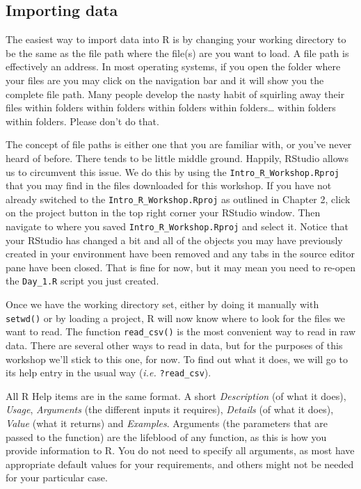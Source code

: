 \documentclass[
]{book}
\begin{document}
\hypertarget{importing-data}{%
\subsection{Importing data}\label{importing-data}}

The easiest way to import data into R is by changing your working directory to be the same as the file path where the file(s) are you want to load. A file path is effectively an address. In most operating systems, if you open the folder where your files are you may click on the navigation bar and it will show you the complete file path. Many people develop the nasty habit of squirling away their files within folders within folders within folders within folders\ldots{} within folders within folders. Please don't do that.

The concept of file paths is either one that you are familiar with, or you've never heard of before. There tends to be little middle ground. Happily, RStudio allows us to circumvent this issue. We do this by using the \texttt{Intro\_R\_Workshop.Rproj} that you may find in the files downloaded for this workshop. If you have not already switched to the \texttt{Intro\_R\_Workshop.Rproj} as outlined in Chapter 2, click on the project button in the top right corner your RStudio window. Then navigate to where you saved \texttt{Intro\_R\_Workshop.Rproj} and select it. Notice that your RStudio has changed a bit and all of the objects you may have previously created in your environment have been removed and any tabs in the source editor pane have been closed. That is fine for now, but it may mean you need to re-open the \texttt{Day\_1.R} script you just created.

Once we have the working directory set, either by doing it manually with \texttt{setwd()} or by loading a project, R will now know where to look for the files we want to read. The function \texttt{read\_csv()} is the most convenient way to read in raw data. There are several other ways to read in data, but for the purposes of this workshop we'll stick to this one, for now. To find out what it does, we will go to its help entry in the usual way (\emph{i.e.} \texttt{?read\_csv}).

All R Help items are in the same format. A short \emph{Description} (of what it does), \emph{Usage}, \emph{Arguments} (the different inputs it requires), \emph{Details} (of what it does), \emph{Value} (what it returns) and \emph{Examples}. Arguments (the parameters that are passed to the function) are the lifeblood of any function, as this is how you provide information to R. You do not need to specify all arguments, as most have appropriate default values for your requirements, and others might not be needed for your particular case.
\end{document}
